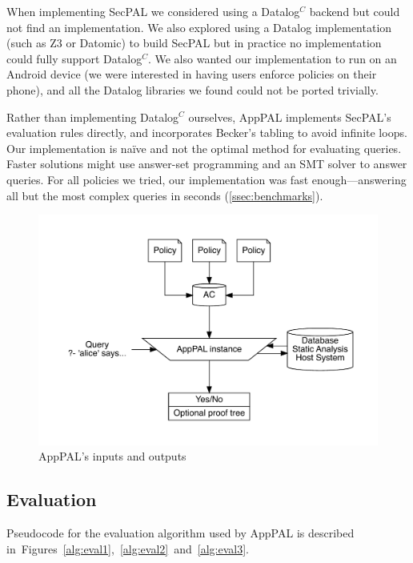 \documentclass[thesis.tex]{subfiles}
\begin{document}
When implementing SecPAL we considered using a Datalog$^C$ backend but could not
find an implementation. We also explored using a Datalog implementation (such as
Z3 or Datomic) to build SecPAL but in practice no implementation could fully
support Datalog$^C$. We also wanted our implementation to run on an Android
device (we were interested in having users enforce policies on their phone),
and all the Datalog libraries we found could not be ported trivially.

Rather than implementing Datalog$^C$ ourselves, AppPAL implements SecPAL's
evaluation rules directly, and incorporates Becker's tabling to avoid infinite
loops. Our implementation is na\"ive and not the optimal method for evaluating
queries. Faster solutions might use answer-set programming and an SMT solver to
answer queries. For all policies we tried, our implementation was fast
enough---answering all but the most complex queries in seconds
(\autoref{ssec:benchmarks}).


\begin{figure}
  \centering
  \includegraphics[width=\linewidth]{figures/apppal-evaluation.pdf}
  \caption{AppPAL's inputs and outputs}
  \label{fig:apppal-inputs-outputs}
\end{figure}

\subsection{Evaluation}
\label{ssec:evaluation-alg}

Pseudocode for the evaluation algorithm used by AppPAL is described
in~Figures~\ref{alg:eval1},~\ref{alg:eval2}~and~\ref{alg:eval3}.
\end{document}
